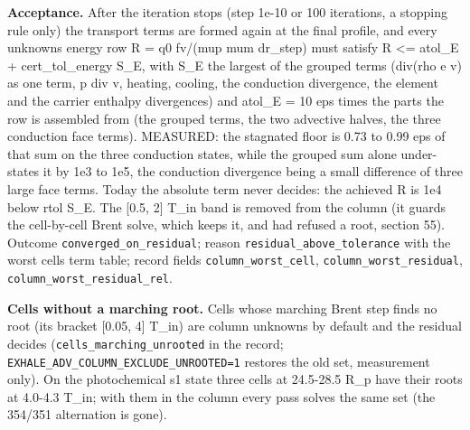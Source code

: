 \documentclass[english,a4paper]{my_memo}
\begin{document}
\textbf{Acceptance.} After the iteration stops (step 1e-10 or 100 iterations, a
stopping rule only) the transport terms are formed again at the final
profile, and every unknown\textquotesingle s energy row R = q0 fv/(mup mum dr\_step) must
satisfy \textbar R\textbar{} \textless= atol\_E + cert\_tol\_energy S\_E, with S\_E the largest of the
grouped terms (div(rho e v) as one term, p div v, heating, cooling, the
conduction divergence, the element and the carrier enthalpy divergences)
and atol\_E = 10 eps times the parts the row is assembled from (the grouped
terms, the two advective halves, the three conduction face terms). MEASURED:
the stagnated floor is 0.73 to 0.99 eps of that sum on the three conduction
states, while the grouped sum alone under-states it by 1e3 to 1e5, the
conduction divergence being a small difference of three large face terms.
Today the absolute term never decides: the achieved \textbar R\textbar{} is 1e4 below
rtol S\_E. The {[}0.5, 2{]} T\_in band is removed from the column (it guards the
cell-by-cell Brent solve, which keeps it, and had refused a root, section
55). Outcome \texttt{converged\_on\_residual}; reason \texttt{residual\_above\_tolerance}
with the worst cell\textquotesingle s term table; record fields \texttt{column\_worst\_cell},
\texttt{column\_worst\_residual}, \texttt{column\_worst\_residual\_rel}.

\textbf{Cells without a marching root.} Cells whose marching Brent step finds no
root (its bracket {[}0.05, 4{]} T\_in) are column unknowns by default and the
residual decides (\texttt{cells\_marching\_unrooted} in the record;
\texttt{EXHALE\_ADV\_COLUMN\_EXCLUDE\_UNROOTED=1} restores the old set, measurement
only). On the photochemical s1 state three cells at 24.5-28.5 R\_p have
their roots at 4.0-4.3 T\_in; with them in the column every pass solves the
same set (the 354/351 alternation is gone).
\end{document}
